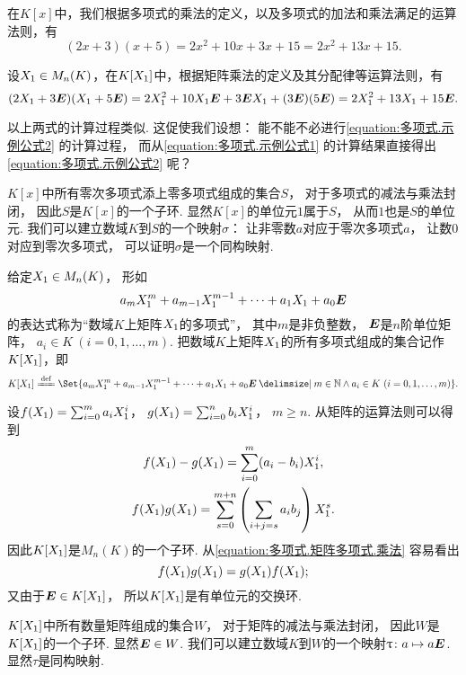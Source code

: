 在\(K[x]\)中，我们根据多项式的乘法的定义，以及多项式的加法和乘法满足的运算法则，有
\begin{equation}\label{equation:多项式.示例公式1}
	(2x+3)(x+5)
	=2x^2+10x+3x+15
	=2x^2+13x+15.
\end{equation}

设\(X_1 \in M_n(K)\)，在\(K[X_1]\)中，根据矩阵乘法的定义及其分配律等运算法则，有
\begin{equation}\label{equation:多项式.示例公式2}
	(2X_1+3\boldsymbol{E})(X_1+5\boldsymbol{E})
	=2X_1^2+10X_1\boldsymbol{E}+3\boldsymbol{E}X_1+(3\boldsymbol{E})(5\boldsymbol{E})
	=2X_1^2+13X_1+15\boldsymbol{E}.
\end{equation}

以上两式的计算过程类似.
这促使我们设想：
能不能不必进行\cref{equation:多项式.示例公式2} 的计算过程，
而从\cref{equation:多项式.示例公式1}
的计算结果直接得出\cref{equation:多项式.示例公式2} 呢？

\(K[x]\)中所有零次多项式添上零多项式组成的集合\(S\)，
对于多项式的减法与乘法封闭，
因此\(S\)是\(K[x]\)的一个子环.
显然\(K[x]\)的单位元\(1\)属于\(S\)，
从而\(1\)也是\(S\)的单位元.
我们可以建立数域\(K\)到\(S\)的一个映射\(\sigma\)：
让非零数\(a\)对应于零次多项式\(a\)，
让数\(0\)对应到零次多项式，
可以证明\(\sigma\)是一个同构映射.

给定\(X_1\in M_n(K)\)，
形如\[
	a_m X_1^m + a_{m-1} X_1^{m-1} + \dotsb + a_1 X_1 + a_0 \boldsymbol{E}
\]的表达式称为“数域\(K\)上矩阵\(X_1\)的多项式”，
其中\(m\)是非负整数，
\(\boldsymbol{E}\)是\(n\)阶单位矩阵，
\(a_i \in K\ (i=0,1,\dotsc,m)\).
把数域\(K\)上矩阵\(X_1\)的所有多项式组成的集合记作\(K[X_1]\)，即\[
	K[\A]
	\defeq
	\Set{
		a_m \A^m + a_{m-1} \A^{m-1} + \dotsb + a_1 \A + a_0 \E
		\given
		m \in \mathbb{N}
		\land
		a_i \in K\ (i=0,1,\dotsc,m)
	}.
\]

设\(f(X_1)=\sum_{i=0}^m a_i X_1^i\)，
\(g(X_1)=\sum_{i=0}^n b_i X_1^i\)，
\(m \geq n\).
从矩阵的运算法则可以得到
\begin{gather}
	f(X_1)-g(X_1)
	= \sum_{i=0}^m (a_i - b_i) X_1^i, \\
	f(X_1) g(X_1)
	= \sum_{s=0}^{m+n} \left( \sum_{i+j=s} a_i b_j \right) X_1^s.
	\label{equation:多项式.矩阵多项式.乘法}
\end{gather}
因此\(K[X_1]\)是\(M_n(K)\)的一个子环.
从\cref{equation:多项式.矩阵多项式.乘法} 容易看出\[
	f(X_1) g(X_1) = g(X_1) f(X_1);
\]
又由于\(\boldsymbol{E} \in K[X_1]\)，
所以\(K[X_1]\)是有单位元的交换环.

\(K[X_1]\)中所有数量矩阵组成的集合\(W\)，
对于矩阵的减法与乘法封闭，
因此\(W\)是\(K[X_1]\)的一个子环.
显然\(\boldsymbol{E} \in W\).
我们可以建立数域\(K\)到\(W\)的一个映射\(\uptau\colon a \mapsto a \boldsymbol{E}\).
显然\(\tau\)是同构映射.

